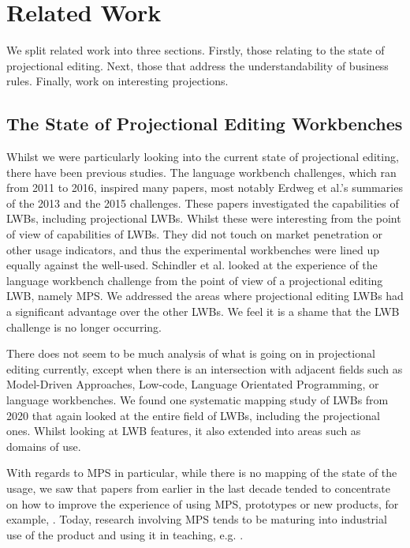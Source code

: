 \chapter{Related Work}
\label{chapter:RelatedWork}

We split related work into three sections. 
Firstly, those relating to the state of projectional editing.
Next, those that address the understandability of business rules.
Finally, work on interesting projections.

\section{The State of Projectional Editing Workbenches}

Whilst we were particularly looking into the current state of projectional editing, there have been previous studies.
The language workbench challenges, which ran from 2011 to 2016, inspired many papers, most notably Erdweg et al.'s summaries of the 2013\cite{erdweg2013state} and the 2015\cite{erdweg2015evaluating} challenges.
These papers investigated the capabilities of LWBs, including projectional LWBs.
Whilst these were interesting from the point of view of capabilities of LWBs. 
They did not touch on market penetration or other usage indicators, and thus the experimental workbenches were lined up equally against the well-used.
Schindler et al.\cite{schindler2016language} looked at the experience of the language workbench challenge from the point of view of a projectional editing LWB, namely MPS.
We addressed the areas where projectional editing LWBs had a significant advantage over the other LWBs. 
We feel it is a shame that the LWB challenge is no longer occurring.

There does not seem to be much analysis of what is going on in projectional editing currently, except when there is an intersection with adjacent fields such as Model-Driven Approaches, Low-code, Language Orientated Programming, or language workbenches.
We found one systematic mapping study of LWBs\cite{iung2020systematic} from 2020 that again looked at the entire field of LWBs, including the projectional ones.
Whilst looking at LWB features, it also extended into areas such as domains of use.

With regards to MPS in particular, while there is no mapping of the state of the usage, we saw that papers from earlier in the last decade tended to concentrate on how to improve the experience of using MPS, prototypes or new products, for example, \cite{pavletic2013extensible,voelter2014generic,voelter2015using,voelter2010language2,voelter2013mbeddr,voelter2013requirements,voelter2014projecting,voelter2015towards,voelter2010embedded,voelter2011product,ratiu2012implementing}.
Today, research involving MPS tends to be maturing into industrial use of the product and using it in teaching, e.g. \cite{prinz2021teaching,voelterdomain_SLR, schindler2021jetbrains_SLR,simi2021learning_SLR,barash2021teaching_SLR,stotz2021migrating_SLR,ratiu2021use}.

